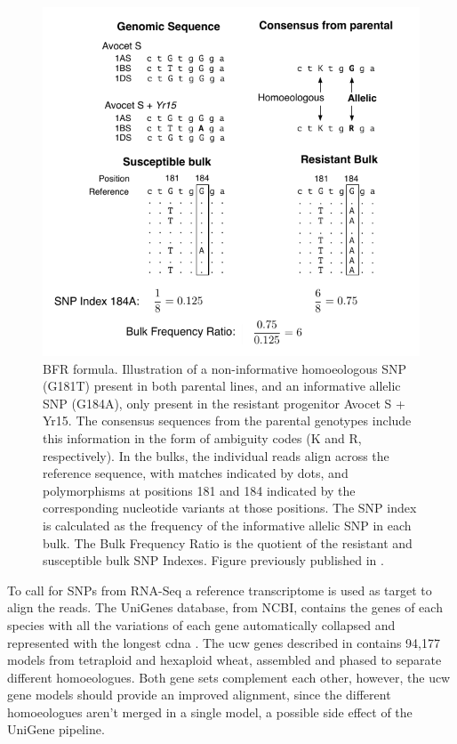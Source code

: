 \begin{figure}
\includegraphics[width=1\textwidth]{Yr15/Figures/bfr.pdf}
\caption[BFR formula]{BFR formula. Illustration of a non-informative homoeologous SNP (G181T) present in both parental lines, and an informative allelic SNP (G184A), only present in the resistant progenitor Avocet S + Yr15. The consensus sequences from the parental genotypes include this information in the form of ambiguity codes (K and R, respectively). In the bulks, the individual reads align across the reference sequence, with matches indicated by dots, and polymorphisms at positions 181 and 184 indicated by the corresponding nucleotide variants at those positions. The SNP index is calculated as the frequency of the informative allelic SNP in each bulk. The Bulk Frequency Ratio is the quotient of the resistant and susceptible bulk SNP Indexes. Figure previously published in \citet{Ramirez-Gonzalez2015c}. }
\label{fig:yr15:bfr}
\end{figure}

To call for SNPs from RNA-Seq a reference transcriptome is used as target to align the reads. 
The UniGenes database, from NCBI, contains the genes of each species with all the variations of each gene automatically collapsed and represented with the longest \acrshort{cdna} \citep{PontiusJUWagnerL2002}. 
The \acrshort{ucw}  genes described in \citet{Krasileva2013} contains 94,177 models from tetraploid and hexaploid wheat, assembled and phased to separate different homoeologues. 
Both gene sets complement each other, however, the \acrshort{ucw} gene models should provide an improved alignment, since the different homoeologues aren't merged in a single model, a possible side effect of the UniGene pipeline. 

